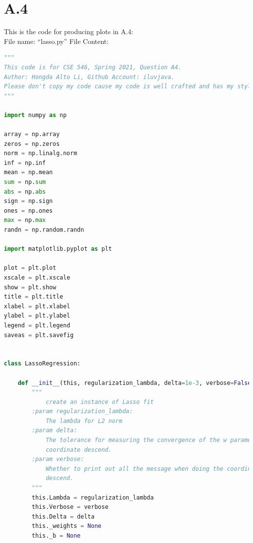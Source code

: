 \documentclass[]{article}
\begin{document}
\section*{A.4}
    This is the code for producing plots in A.4: 
    \\
    File name: ``lasso.py''
    File Content: 
    \begin{lstlisting}[language=python]
"""
This code is for CSE 546, Spring 2021, Question A4.
Author: Hongda Alto Li, Github Account: iluvjava.
Please don't copy my code cause my code is well crafted and has my style in it.
"""

import numpy as np

array = np.array
zeros = np.zeros
norm = np.linalg.norm
inf = np.inf
mean = np.mean
sum = np.sum
abs = np.abs
sign = np.sign
ones = np.ones
max = np.max
randn = np.random.randn

import matplotlib.pyplot as plt

plot = plt.plot
xscale = plt.xscale
show = plt.show
title = plt.title
xlabel = plt.xlabel
ylabel = plt.ylabel
legend = plt.legend
saveas = plt.savefig


class LassoRegression:

    def __init__(this, regularization_lambda, delta=1e-3, verbose=False):
        """
            create an instance of Lasso fit
        :param regularization_lambda:
            The lambda for L2 norm
        :param delta:
            The tolerance for measuring the convergence of the w parameter for
            coordinate descend.
        :param verbose:
            Whether to print out all the message when doing the coordinate
            descend.
        """
        this.Lambda = regularization_lambda
        this.Verbose = verbose
        this.Delta = delta
        this._weights = None
        this._b = None


\end{lstlisting}
\end{document}
